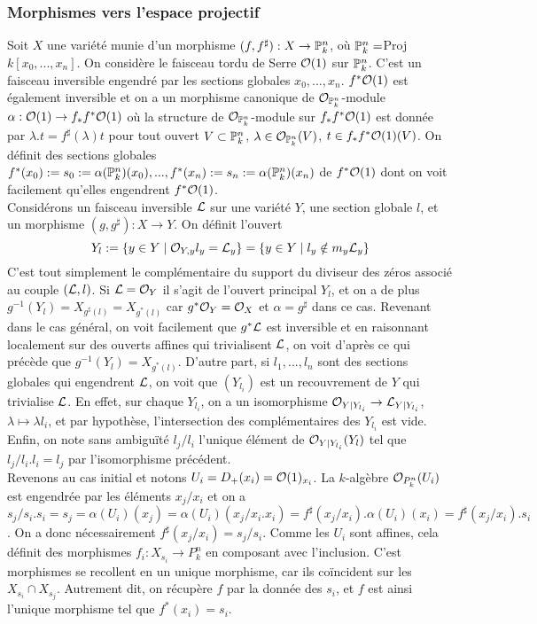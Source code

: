 \subsubsection{Morphismes vers l'espace projectif}
\label{morphismeproj}
Soit $X$ une variété munie d'un morphisme $(f,f^\sharp):X\rightarrow \mathbb{P}^n_k$, où $\mathbb{P}^n_k=$Proj$k[x_0,...,x_n]$. On considère le faisceau tordu de Serre $\mathcal{O}(1)$ sur $\mathbb{P}^n_k$. C'est un faisceau inversible engendré par les sections globales $x_0,...,x_n$. $f^*\mathcal{O}(1)$ est également inversible et on a un morphisme canonique de $\mathcal{O}_{\mathbb{P}^n_k}$-module $\alpha:\mathcal{O}(1)\rightarrow f_*f^*\mathcal{O}(1)$ où la structure de $\mathcal{O}_{\mathbb{P}^n_k}$-module sur $f_*f^*\mathcal{O}(1)$ est donnée par $\lambda.t=f^\sharp(\lambda)t$ pour tout ouvert $V\subset \mathbb{P}^n_k$, $\lambda\in \mathcal{O}_{\mathbb{P}^n_k}(V)$, $t\in f_*f^*\mathcal{O}(1)(V)$. On définit des sections globales $f^*(x_0):=s_0:=\alpha(\mathbb{P}^n_k)(x_0),...,f^*(x_n):=s_n:=\alpha(\mathbb{P}^n_k)(x_n)$ de $f^*\mathcal{O}(1)$ dont on voit facilement qu'elles engendrent $f^*\mathcal{O}(1)$.\\
Considérons un faisceau inversible $\mathcal{L}$ sur une variété $Y$, une section globale $l$, et un morphisme $(g,g^\sharp):X\rightarrow Y$. On définit l'ouvert 
$$Y_l:=\lbrace y\in Y\mid \mathcal{O}_{Y,y}l_y=\mathcal{L}_y\rbrace=\lbrace y\in Y\mid l_y\notin m_y\mathcal{L}_y\rbrace$$
C'est tout simplement le complémentaire du support du diviseur des zéros associé au couple $(\mathcal{L},l)$. Si $\mathcal{L}=\mathcal{O}_Y$ il s'agit de l'ouvert principal $Y_l$, et on a de plus $g^{-1}(Y_l)=X_{g^\sharp(l)}=X_{g^*(l)}$ car $g^*\mathcal{O}_Y=\mathcal{O}_X$ et $\alpha=g^\sharp$ dans ce cas. Revenant dans le cas général, on voit facilement que $g^*\mathcal{L}$ est inversible et en raisonnant localement sur des ouverts affines qui trivialisent $\mathcal{L}$, on voit d'après ce qui précède que $g^{-1}(Y_l)=X_{g^*(l)}$. D'autre part, si $l_1,...,l_n$ sont des sections globales qui engendrent $\mathcal{L}$, on voit que $(Y_{l_i})$ est un recouvrement de $Y$ qui trivialise $\mathcal{L}$. En effet, sur chaque $Y_{l_i}$, on a un isomorphisme $\mathcal{O}_{Y|Y_{l_i}}\rightarrow \mathcal{L}_{Y|Y_{l_i}}$, $\lambda \mapsto \lambda l_i$, et par hypothèse, l'intersection des complémentaires des $Y_{l_i}$ est vide. Enfin, on note sans ambiguïté $l_j/l_i$ l'unique élément de $\mathcal{O}_{Y|Y_{l_i}}(Y_l)$ tel que $l_j/l_i.l_i=l_j$ par l'isomorphisme précédent.\\
Revenons au cas initial et notons $U_i=D_+(x_i)=\mathcal{O}(1)_{x_i}$. La $k$-algèbre $\mathcal{O}_{P^n_k}(U_i)$ est engendrée par les éléments $x_j/x_i$ et on a $s_j/s_i.s_i=s_j=\alpha(U_i)(x_j)=\alpha(U_i)(x_j/x_i.x_i)=f^\sharp(x_j/x_i).\alpha(U_i)(x_i)=f^\sharp(x_j/x_i).s_i$. On a donc nécessairement $f^\sharp(x_j/x_i)=s_j/s_i$. Comme les $U_i$ sont affines, cela définit des morphismes $f_i:X_{s_i}\rightarrow P^n_k$ en composant avec l'inclusion. C'est morphismes se recollent en un unique morphisme, car ils coïncident sur les $X_{s_i}\cap X_{s_j}$. Autrement dit, on récupère $f$ par la donnée des $s_i$, et $f$ est ainsi l'unique morphisme tel que $f^*(x_i)=s_i$.\\
